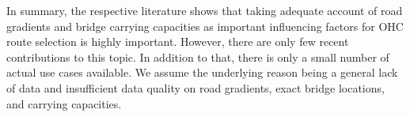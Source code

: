 \par
In summary, the respective literature shows that taking adequate account of road gradients and bridge carrying capacities as important influencing factors for OHC route selection is highly important. However, there are only few recent contributions to this topic. In addition to that, there is only a small number of actual use cases available. We assume the underlying reason being a general lack of data and insufficient data quality on road gradients, exact bridge locations, and carrying capacities.



%
%
%
%
